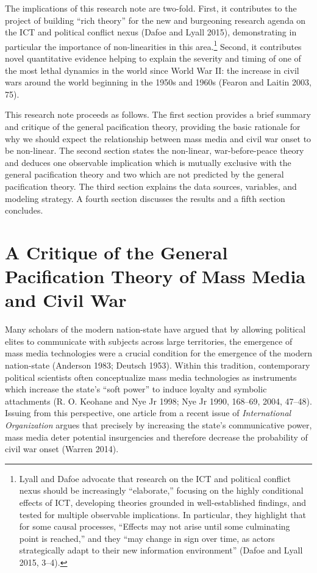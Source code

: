 \documentclass[11pt,article,oneside]{memoir}
\begin{document}
The implications of this research note are two-fold. First, it
contributes to the project of building ``rich theory'' for the new and
burgeoning research agenda on the ICT and political conflict nexus
(Dafoe and Lyall 2015), demonstrating in particular the importance of
non-linearities in this area.\footnote{Lyall and Dafoe advocate that
  research on the ICT and political conflict nexus should be
  increasingly ``elaborate,'' focusing on the highly conditional effects
  of ICT, developing theories grounded in well-established findings, and
  tested for multiple observable implications. In particular, they
  highlight that for some causal processes, ``Effects may not arise
  until some culminating point is reached,'' and they ``may change in
  sign over time, as actors strategically adapt to their new information
  environment'' (Dafoe and Lyall 2015, 3--4).} Second, it contributes
novel quantitative evidence helping to explain the severity and timing
of one of the most lethal dynamics in the world since World War II: the
increase in civil wars around the world beginning in the 1950s and 1960s
(Fearon and Laitin 2003, 75).

This research note proceeds as follows. The first section provides a
brief summary and critique of the general pacification theory, providing
the basic rationale for why we should expect the relationship between
mass media and civil war onset to be non-linear. The second section
states the non-linear, war-before-peace theory and deduces one
observable implication which is mutually exclusive with the general
pacification theory and two which are not predicted by the general
pacification theory. The third section explains the data sources,
variables, and modeling strategy. A fourth section discusses the results
and a fifth section concludes.

\section{A Critique of the General Pacification Theory of Mass Media and
Civil
War}\label{a-critique-of-the-general-pacification-theory-of-mass-media-and-civil-war}

Many scholars of the modern nation-state have argued that by allowing
political elites to communicate with subjects across large territories,
the emergence of mass media technologies were a crucial condition for
the emergence of the modern nation-state (Anderson 1983; Deutsch 1953).
Within this tradition, contemporary political scientists often
conceptualize mass media technologies as instruments which increase the
state's ``soft power'' to induce loyalty and symbolic attachments (R. O.
Keohane and Nye Jr 1998; Nye Jr 1990, 168--69, 2004, 47--48). Issuing
from this perspective, one article from a recent issue of
\emph{International Organization} argues that precisely by increasing
the state's communicative power, mass media deter potential insurgencies
and therefore decrease the probability of civil war onset (Warren 2014).
\end{document}
